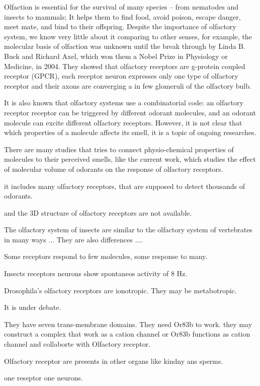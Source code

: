 \documentclass[11pt]{paper} %
\begin{document}
Olfaction is essential for the survival of many species -- from nematodes and insects to mammals; 
It helps them to find food, avoid poison, escape danger, meet mate, and bind to their offspring.
Despite the importance of olfactory system, we know very little about it comparing to other senses, 
for example, 
the molecular basis of olfaction was unknown until the break through by Linda B. Buck and Richard Axel, 
which won them a Nobel Prize in Physiology or Medicine, in 2004.
They showed that olfactory receptors are g-protein coupled receptor (GPCR), 
each receptor neuron expresses only one type of olfactory receptor and
their axons are converging a in few glomeruli of the olfactory bulb. 

It is also known that olfactory systems use a combinatorial code: 
an olfactory receptor receptor can be triggered by different odorant molecules, 
and an odorant molecule can excite different olfactory receptors.  
However, it is not clear that which properties of a molecule affects its smell, 
it is a topic of ongoing researches. 

There are many studies that tries to connect physio-chemical properties of molecules to their perceived smells, 
like the current work, which studies the effect of molecular volume of odorants on the response of olfactory receptors.




it includes many olfactory receptors, 
that are supposed to detect thousands of odorants.


and the 3D structure of olfactory receptors are not available.


The olfactory system of insects are similar to the olfactory system of vertebrates in many ways ... 
They are also differences .... 

Some receptors respond to few molecules, some response to many.

Insects receptors neurons show spontaneos activity of 8 Hz.

Drosophila's olfactory receptors are ionotropic. 
They may be metabotropic.

It is under debate.

They have seven trans-membrane domains. 
They need Or83b to work. 
they may construct a complex that work as a cation channel
or Or83b functions as cation channel and collaborte with Olfactory receptor.

Olfactory receptor are presents in other organs like kindny ans sperms.

one reseptor one neurons.
\end{document}

